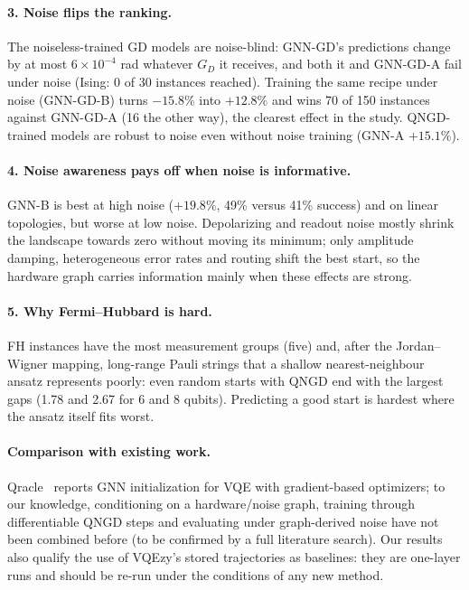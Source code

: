 \documentclass{ssnreview}
\begin{document}
\paragraph{3. Noise flips the ranking.} The noiseless-trained GD models are noise-blind:
GNN-GD's predictions change by at most $6\times10^{-4}$ rad whatever $G_D$ it receives, and both
it and GNN-GD-A fail under noise (Ising: 0 of 30 instances reached). Training the same recipe
under noise (GNN-GD-B) turns $-15.8\%$ into $+12.8\%$ and wins 70 of 150 instances against
GNN-GD-A (16 the other way), the clearest effect in the study. QNGD-trained models are robust
to noise even without noise training (GNN-A $+15.1\%$).

\paragraph{4. Noise awareness pays off when noise is informative.} GNN-B is best at high noise
($+19.8\%$, 49\% versus 41\% success) and on linear topologies, but worse at low noise.
Depolarizing and readout noise mostly shrink the landscape towards zero without moving its
minimum; only amplitude damping, heterogeneous error rates and routing shift the best start, so
the hardware graph carries information mainly when these effects are strong.

\paragraph{5. Why Fermi--Hubbard is hard.} FH instances have the most measurement groups (five)
and, after the Jordan--Wigner mapping, long-range Pauli strings that a shallow nearest-neighbour
ansatz represents poorly: even random starts with QNGD end with the largest gaps (1.78 and 2.67
for 6 and 8 qubits). Predicting a good start is hardest where the ansatz itself fits worst.

\paragraph{Comparison with existing work.} Qracle~\cite{qracle} reports GNN initialization for
VQE with gradient-based optimizers; to our knowledge, conditioning on a hardware/noise graph,
training through differentiable QNGD steps and evaluating under graph-derived noise have not
been combined before (to be confirmed by a full literature search). Our results also qualify
the use of VQEzy's stored trajectories as baselines: they are one-layer runs and should be
re-run under the conditions of any new method.
\end{document}
